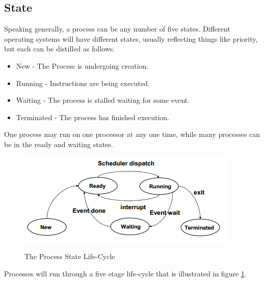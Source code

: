 \documentclass[10pt,a4paper]{article}
\begin{document}
\subsection{State}
Speaking generally, a process can be any number of five states. Different operating systems will have different states, usually reflecting things like priority, but each can be distilled as follows. 
\begin{itemize}
\item New - The Process is undergoing creation.
\item Running - Instructions are being executed.
\item Waiting - The process is stalled waiting for some event.
\item Terminated - The process has finished execution.
\end{itemize}
One process may run on one processor at any one time, while many processes can be in the ready and waiting states. 
\begin{figure}
\caption{The Process State Life-Cycle \cite{OSCONCEPTS}}
\begin{center}
\includegraphics[scale=0.75]{../images/process-state.png}
\label{procstate}
\end{center}
\end{figure}
Processes will run through a five stage life-cycle that is illustrated in figure \ref{procstate}. 
\end{document}
